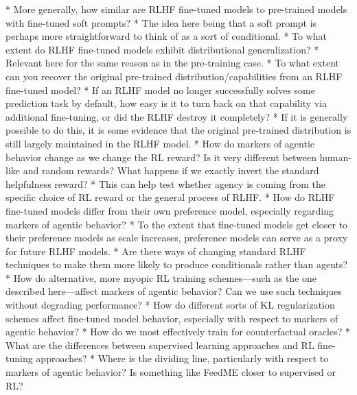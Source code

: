 {{    * More generally, how similar are RLHF fine-tuned models to pre-trained models with fine-tuned soft prompts?
        * The idea here being that a soft prompt is perhaps more straightforward to think of as a sort of conditional.
    * To what extent do RLHF fine-tuned models exhibit distributional generalization\cite{TODO: cite https://arxiv.org/abs/2009.08092}?
        * Relevant here for the same reason as in the pre-training case.
    * To what extent can you recover the original pre-trained distribution/capabilities from an RLHF fine-tuned model?
        * If an RLHF model no longer successfully solves some prediction task by default, how easy is it to turn back on that capability via additional fine-tuning, or did the RLHF destroy it completely?
        * If it is generally possible to do this, it is some evidence that the original pre-trained distribution is still largely maintained in the RLHF model.
    * How do markers of agentic behavior\cite{TODO: cite TODO} change as we change the RL reward? Is it very different between human-like and random rewards? What happens if we exactly invert the standard helpfulness reward?
        * This can help test whether agency is coming from the specific choice of RL reward or the general process of RLHF.
    * How do RLHF fine-tuned models differ from their own preference model, especially regarding markers of agentic behavior\cite{TODO: cite TODO}?
        * To the extent that fine-tuned models get closer to their preference models as scale increases, preference models can serve as a proxy for future RLHF models.
* Are there ways of changing standard RLHF techniques to make them more likely to produce conditionals rather than agents?
    * How do alternative, more myopic RL training schemes---such as the one described here\cite{TODO: cite https://www.alignmentforum.org/posts/dzDKDRJPQ3kGqfER9/you-can-still-fetch-the-coffee-today-if-you-re-dead-tomorrow}---affect markers of agentic behavior\cite{TODO: cite TODO}? Can we use such techniques without degrading performance?
    * How do different sorts of KL regularization schemes affect fine-tuned model behavior, especially with respect to markers of agentic behavior\cite{TODO: cite TODO}?
    * How do we most effectively train for counterfactual oracles\cite{TODO: cite https://www.alignmentforum.org/posts/yAiqLmLFxvyANSfs2/counterfactual-oracles-online-supervised-learning-with}?
* What are the differences between supervised learning approaches and RL fine-tuning approaches?
    * Where is the dividing line, particularly with respect to markers of agentic behavior\cite{TODO: cite TODO}? Is something like FeedME\cite{TODO: cite https://beta.openai.com/docs/model-index-for-researchers} closer to supervised or RL?
}}
